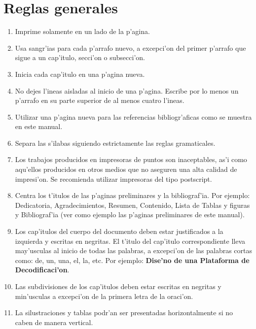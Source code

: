 \section{Reglas generales}
\noindent
\begin{enumerate}
	\item Imprime solamente en un lado de la p'agina.
	\item Usa sangr'ias para cada p'arrafo nuevo, a excepci'on del primer p'arrafo que sigue a un cap'itulo, secci'on o subsecci'on.
	\item Inicia cada cap'itulo en una p'agina nueva.
	\item No dejes l'ineas aisladas al inicio de una p'agina. Escribe por lo menos un p'arrafo en su parte superior de al menos cuatro l'ineas.
	\item Utilizar una p'agina nueva para las referencias bibliogr'aficas como se muestra en este manual.
	\item Separa las s'ilabas siguiendo estrictamente las reglas gramaticales.
	\item Los trabajos producidos en impresoras de puntos son inaceptables, as'i como aqu'ellos producidos en otros medios que no aseguren una alta calidad de impresi'on. Se recomienda utilizar impresoras del tipo postscript.
	\item Centra los t'itulos de las p'aginas preliminares y la bibliograf'ia. Por ejemplo: Dedicatoria, Agradecimientos, Resumen, Contenido, Lista de Tablas y figuras y Bibliograf'ia (ver como ejemplo las p'aginas preliminares de este manual).
	\item Los cap'itulos del cuerpo del documento deben estar justificados a la izquierda y escritas en negritas. El t'itulo del cap'itulo correspondiente lleva may'usculas al inicio de todas las palabras, a excepci'on de las palabras cortas como: de, un, una, el, la, etc. Por ejemplo: \textbf{Dise'no de una Plataforma de Decodificaci'on}.
	\item Las subdivisiones de los cap'itulos deben estar escritas en negritas y min'usculas a excepci'on de la primera letra de la oraci'on.
	\item La silustraciones y tablas podr'an ser presentadas horizontalmente si no caben de manera vertical.
\end{enumerate}

